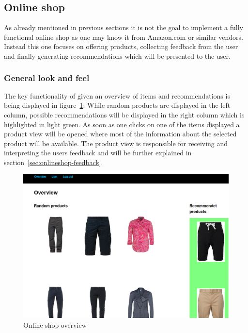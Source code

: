 
\subsection{Online shop}
\label{sec:online-shop}
As already mentioned in previous sections it is not the goal to implement a fully functional online shop as one may know it from Amazon.com or similar vendors.
Instead this one focuses on offering products, collecting feedback from the user and finally generating recommendations which will be presented to the user.

\subsubsection{General look and feel}
The key functionality of given an overview of items and recommendations is being displayed in figure~\ref{fig:onlineshop-overview}.
While random products are displayed in the left column, possible recommendations will be displayed in the right column which is highlighted in light green.
As soon as one clicks on one of the items displayed a product view will be opened where most of the information about the selected product will be available.
The product view is responsible for receiving and interpreting the users feedback and will be further explained in section~\ref{sec:onlineshop-feedback}.

\begin{figure}[h]
    \center
    \includegraphics[scale=0.3]{inc/implementation/onlineshop/recommender_onlineshop_overview}
    \caption{Online shop overview}
    \label{fig:onlineshop-overview}
\end{figure}

